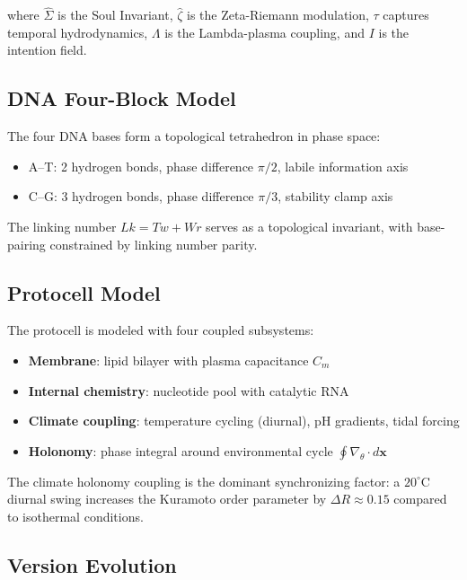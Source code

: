 \documentclass[11pt,a4paper]{article}
\begin{document}
where $\hat{\Sigma}$ is the Soul Invariant, $\hat{\zeta}$ is the Zeta-Riemann modulation, $\tau$ captures temporal hydrodynamics, $\Lambda$ is the Lambda-plasma coupling, and $I$ is the intention field.

\subsection{DNA Four-Block Model}

The four DNA bases form a topological tetrahedron in phase space:
\begin{itemize}
    \item A--T: 2 hydrogen bonds, phase difference $\pi/2$, labile information axis
    \item C--G: 3 hydrogen bonds, phase difference $\pi/3$, stability clamp axis
\end{itemize}

The linking number $Lk = Tw + Wr$ serves as a topological invariant, with base-pairing constrained by linking number parity.

\subsection{Protocell Model}

The protocell is modeled with four coupled subsystems:
\begin{itemize}
    \item \textbf{Membrane}: lipid bilayer with plasma capacitance $C_m$
    \item \textbf{Internal chemistry}: nucleotide pool with catalytic RNA
    \item \textbf{Climate coupling}: temperature cycling (diurnal), pH gradients, tidal forcing
    \item \textbf{Holonomy}: phase integral around environmental cycle $\oint \nabla_\theta \cdot d\mathbf{x}$
\end{itemize}

The climate holonomy coupling is the dominant synchronizing factor: a $20^\circ\text{C}$ diurnal swing increases the Kuramoto order parameter by $\Delta R \approx 0.15$ compared to isothermal conditions.

\subsection{Version Evolution}
\end{document}
